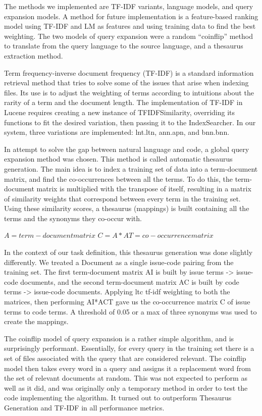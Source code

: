\documentclass[10pt,a4paper]{article}
\begin{document}
The methods we implemented are TF-IDF variants, language models, and query expansion models. A method for future implementation is a feature-based ranking model using TF-IDF and LM as features and using training data to find the best weighting. The two models of query expansion were a random “coinflip” method to translate from the query language to the source language, and a thesaurus extraction method.
  
Term frequency-inverse document frequency (TF-IDF) is a standard information retrieval method that tries to solve some of the issues that arise when indexing files. Its use is to adjust the weighting of terms according to intuitions about the rarity of a term and the document length. The implementation of TF-IDF in Lucene requires creating a new instance of TFIDFSimilarity, overriding its functions to fit the desired variation, then passing it to the IndexSearcher. In our system, three variations are implemented: lnt.ltn, ann.apn, and bnn.bnn.

In attempt to solve the gap between natural language and code, a global query expansion method was chosen. This method is called automatic thesaurus generation. The main idea is to index a training set of data into a term-document matrix, and find the co-occurrences between all the terms. To do this, the term-document matrix is multiplied with the transpose of itself, resulting in a matrix of similarity weights that correspond between every term in the training set. Using these similarity scores, a thesaurus (mappings) is built containing all the terms and the synonyms they co-occur with. 

    $A = term-document matrix$
    $C = A*AT = co-occurrence matrix$

In the context of our task definition, this thesaurus generation was done slightly differently. We treated a Document as a single issue-code pairing from the training set. The first term-document matrix AI is built by issue terms -> issue-code documents, and the second term-document matrix AC is built by code terms -> issue-code documents. Applying ltc tf-idf weighting to both the matrices, then performing AI*ACT gave us the co-occurrence matrix C of issue terms to code terms. A threshold of 0.05 or a max of three synonyms was used to create the mappings.

The coinflip model of query expansion is a rather simple algorithm, and is surprisingly performant. Essentially, for every query in the training set there is a set of files associated with the query that are considered relevant. The coinflip model then takes every word in a query and assigns it a replacement word from the set of relevant documents at random. This was not expected to perform as well as it did, and was originally only a temporary method in order to test the code implementing the algorithm. It turned out to outperform Thesaurus Generation and TF-IDF in all performance metrics.
\end{document}
